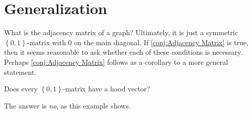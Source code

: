 \section{Generalization}

What is the adjacency matrix of a graph? Ultimately, it is just a symmetric $\left\{0,1\right\}$-matrix with $0$ on the main diagonal. If \autoref{conj:Adjacency Matrix} is true, then it seems reasonable to ask whether  each of these conditions is necessary. Perhaps \autoref{conj:Adjacency Matrix} follows as a corollary to a more general statement.

\begin{question}Does every $\left\{0,1\right\}$-matrix have a hood vector?
\end{question}

The answer is \emph{no}, as this example shows.

